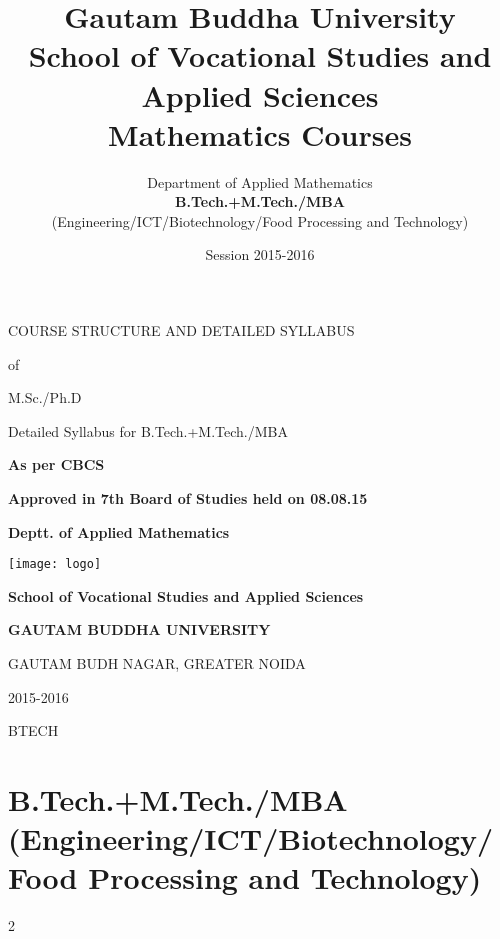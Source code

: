 \documentclass[12pt]{article}
\newcommand{\cols}{2}
\begin{document}
\begin{titlepage}

\begin{center}


\vspace{2cm}
{\Large COURSE STRUCTURE AND DETAILED SYLLABUS}

\vspace{1cm}
{\Large {of }}

\vspace{1cm}
{\Large  {M.Sc./Ph.D}}

\vspace{1cm}
{\Large  {Detailed Syllabus for  B.Tech.+M.Tech./MBA}}


\vspace{1cm}
{\huge \bf As per CBCS}

\vfill
{\huge \bf Approved in 7th Board of Studies held on 08.08.15}

\vspace{3cm}
{\huge \bf {Deptt. of Applied Mathematics}}

\vspace{3cm}
\texttt{[image: logo]}

\vspace{1cm}
{\bf \huge {School of Vocational Studies  and Applied Sciences}}

\vspace{1cm}
{\uppercase{ \Large \bf  {GAUTAM BUDDHA UNIVERSITY}}}

\vspace{1cm}
{\large {GAUTAM BUDH NAGAR, GREATER NOIDA}}

\vspace{1cm}
{\huge 2015-2016}
\end{center}
\end{titlepage}

\title{Gautam Buddha University \\ School of Vocational Studies and Applied Sciences\\ Mathematics Courses}
\author{Department of Applied Mathematics \\ \textbf{B.Tech.+M.Tech./MBA} \\{ (Engineering/ICT/Biotechnology/Food Processing and Technology)}}
\date{Session 2015-2016}
\maketitle
\vspace{-1cm}
\tableofcontents
\newpage
BTECH
\part{\normalsize B.Tech.+M.Tech./MBA \\ (Engineering/ICT/Biotechnology/Food Processing and Technology)}
\begin{multicols}{\cols}
\end{multicols}
\newpage
\end{document}
